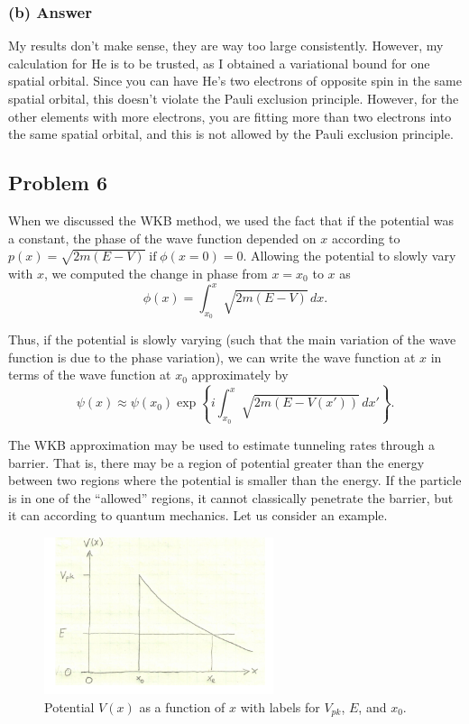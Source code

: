 \documentclass{article}
\begin{document}
\subsubsection*{(b) Answer}
My results don't make sense, they are way too large consistently. However, my calculation for He is to be trusted, as I obtained a variational bound for one spatial orbital. Since you can have He's two electrons of opposite spin in the same spatial orbital, this doesn't violate the Pauli exclusion principle. However, for the other elements with more electrons, you are fitting more than two electrons into the same spatial orbital, and this is not allowed by the Pauli exclusion principle.

\subsection*{Problem 6}
When we discussed the WKB method, we used the fact that if the potential was a constant, the phase of the wave function depended on \( x \) according to \( p(x) = \sqrt{2m(E-V)}\; \text{if}\; \phi(x = 0) = 0 \). Allowing the potential to slowly vary with \( x \), we computed the change in phase from \( x = x_0 \) to \( x \) as
\begin{equation}
    \phi(x) = \int_{x_0}^{x} \sqrt{2m(E-V)}\,dx.
\end{equation}

Thus, if the potential is slowly varying (such that the main variation of the wave function is due to the phase variation), we can write the wave function at \( x \) in terms of the wave function at \( x_0 \) approximately by
\begin{equation}
    \psi(x) \approx \psi(x_0) \exp \left\{ i \int_{x_0}^{x} \sqrt{2m(E-V(x'))}\,dx' \right\}.
\end{equation}

The WKB approximation may be used to estimate tunneling rates through a barrier. That is, there may be a region of potential greater than the energy between two regions where the potential is smaller than the energy. If the particle is in one of the ``allowed'' regions, it cannot classically penetrate the barrier, but it can according to quantum mechanics. Let us consider an example.



\begin{figure}[h!]
    \centering
    \includegraphics[width=0.6\textwidth]{figure.png}
    \caption{Potential \( V(x) \) as a function of \( x \) with labels for \( V_{pk} \), \( E \), and \( x_0 \).}
\end{figure}
\end{document}
